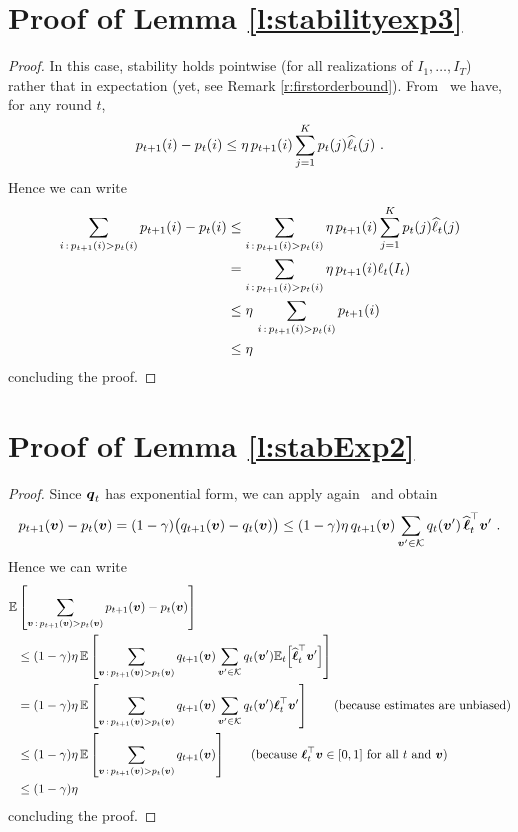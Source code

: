 \section{Proof of Lemma \ref{l:stabilityexp3}}
\begin{proof}
In this case, stability holds pointwise (for all realizations of $I_1,\dots,I_T$) rather that in expectation (yet, see Remark \ref{r:firstorderbound}). From~\cite[Lemma 1]{cgmm16} we have, for any round $t$,
\[
    p_{t+1}(i) - p_t(i) \leq \eta\,p_{t+1}(i) \sum_{j=1}^K p_t(j) \widehat{\ell}_t(j)~.
\]
%
Hence we can write
%
\begin{align*}
\sum_{i\,:\,p_{t+1}(i) > p_t(i)} p_{t+1}(i)-p_t(i)
&\leq
\sum_{i\,:\,p_{t+1}(i) > p_t(i)} \eta\,p_{t+1}(i) \sum_{j=1}^K p_t(j) \widehat{\ell}_t(j)\\
&=
\sum_{i\,:\,p_{t+1}(i) > p_t(i)} \eta\,p_{t+1}(i) \ell_t(I_t)\\
&\leq
\eta\,\sum_{i\,:\,p_{t+1}(i) > p_t(i)} p_{t+1}(i)\\
&\leq
\eta
\end{align*}
concluding the proof.
\end{proof}



\section{Proof of Lemma \ref{l:stabExp2}}
%
\begin{proof}
Since $\boldsymbol{q}_t$ has exponential form, we can apply again~\cite[Lemma 1]{cgmm16} and obtain
\[
    p_{t+1}(\boldsymbol{v}) - p_t(\boldsymbol{v})
=
    (1-\gamma)\big(q_{t+1}(\boldsymbol{v}) - q_t(\boldsymbol{v})\big)
\le
    (1-\gamma)\eta\,q_{t+1}(\boldsymbol{v}) \sum_{\boldsymbol{v}'\in\mathcal{K}} q_t(\boldsymbol{v}')\,\widehat{\boldsymbol{\ell}}_t^{\top}\boldsymbol{v}'~.
\]
%
Hence we can write
%
\begin{align*}
    \E&\left[\sum_{\bv \,:\, p_{t+1}(\bv) > p_t(\bv)} p_{t+1}(\bv) - p_t(\bv) \right]
\\&\le
    (1-\gamma)\eta\,\E\left[\sum_{\bv \,:\, p_{t+1}(\bv) > p_t(\bv)} q_{t+1}(\bv) \sum_{\bv'\in\scK} q_t(\bv') \E_t\Big[\blhat_t^{\top}\bv'\Big] \right]
\\&=
    (1-\gamma)\eta\,\E\left[\sum_{\bv \,:\, p_{t+1}(\bv) > p_t(\bv)} q_{t+1}(\bv) \sum_{\bv'\in\scK} q_t(\bv') \bloss_t^{\top}\bv' \right]
    \tag{because estimates are unbiased}
\\&\le
    (1-\gamma)\eta\,\E\left[\sum_{\bv \,:\, p_{t+1}(\bv) > p_t(\bv)} q_{t+1}(\bv) \right]
    \tag{because $\bloss_t^{\top}\bv \in [0,1]$ for all $t$ and $\bv$}
\\&\le
    (1-\gamma)\eta
\end{align*}
concluding the proof.
\end{proof}



